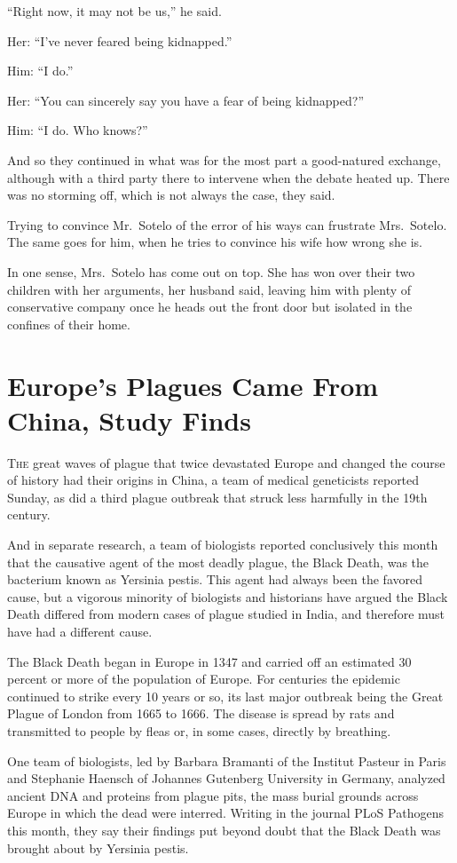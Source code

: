 ﻿\documentclass[12pt]{article}
\begin{document}
``Right now, it may not be us,'' he said.

Her: ``I've never feared being kidnapped.''

Him: ``I do.''

Her: ``You can sincerely say you have a fear of being kidnapped?''

Him: ``I do. Who knows?''

And so they continued in what was for the most part a good-natured exchange, although with a third
party there to intervene when the debate heated up. There was no storming off, which is not always
the case, they said.

Trying to convince Mr.~Sotelo of the error of his ways can frustrate Mrs.~Sotelo. The same goes for
him, when he tries to convince his wife how wrong she is.

In one sense, Mrs.~Sotelo has come out on top. She has won over their two children with her
arguments, her husband said, leaving him with plenty of conservative company once he heads out the
front door but isolated in the confines of their home.

\section{Europe's Plagues Came From China, Study Finds}

\lettrine{T}{he} great waves of plague that twice devastated Europe and
changed the course of history had their origins in China, a team of medical geneticists reported
Sunday, as did a third plague outbreak that struck less harmfully in the 19th century.

And in separate research, a team of biologists reported conclusively this month that the causative
agent of the most deadly plague, the Black Death, was the bacterium known as Yersinia pestis. This
agent had always been the favored cause, but a vigorous minority of biologists and historians have
argued the Black Death differed from modern cases of plague studied in India, and therefore must
have had a different cause.

The Black Death began in Europe in 1347 and carried off an estimated 30 percent or more of the
population of Europe. For centuries the epidemic continued to strike every 10 years or so, its last
major outbreak being the Great Plague of London from 1665 to 1666. The disease is spread by rats and
transmitted to people by fleas or, in some cases, directly by breathing.

One team of biologists, led by Barbara Bramanti of the Institut Pasteur in Paris and Stephanie
Haensch of Johannes Gutenberg University in Germany, analyzed ancient DNA and proteins from plague
pits, the mass burial grounds across Europe in which the dead were interred. Writing in the journal
PLoS Pathogens this month, they say their findings put beyond doubt that the Black Death was brought
about by Yersinia pestis.
\end{document}
